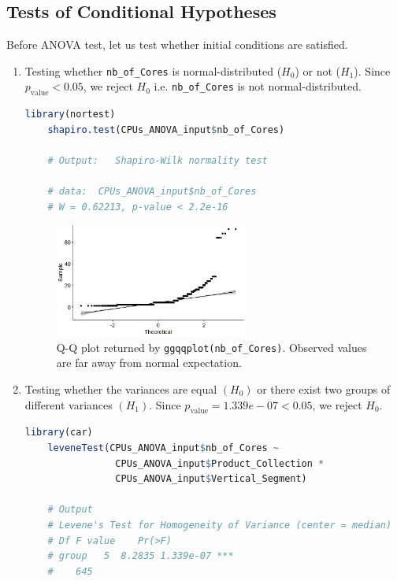 \subsection{Tests of Conditional Hypotheses}
Before ANOVA test, let us test whether initial conditions are satisfied.
\begin{enumerate}
  \item Testing whether \texttt{nb\_of\_Cores} is normal-distributed ($H_0$) or not ($H_1$). Since $p_{\mathrm{value}}< 0.05$, we reject $H_0$ i.e. \texttt{nb\_of\_Cores} is not normal-distributed.
        \begin{lstlisting}[language=R]
    library(nortest)
    shapiro.test(CPUs_ANOVA_input$nb_of_Cores)

    # Output: 	Shapiro-Wilk normality test

    # data:  CPUs_ANOVA_input$nb_of_Cores
    # W = 0.62213, p-value < 2.2e-16
  \end{lstlisting}

        \begin{figure}[ht]
          \centering
          \includegraphics[width=0.6\textwidth]{img/5.png}
          \vspace{0.5cm}
          \caption{Q-Q plot returned by \texttt{ggqqplot(nb\_of\_Cores)}. Observed values are far away from normal expectation.}
        \end{figure}

  \item Testing whether the variances are equal $(H_0)$ or there exist two groups of different variances $(H_1)$. Since $p_{\mathrm{value}} = 1.339e-07 < 0.05$, we reject $H_0$.
        \begin{lstlisting}[language=R]
    library(car)
    leveneTest(CPUs_ANOVA_input$nb_of_Cores ~ 
                CPUs_ANOVA_input$Product_Collection * 
                CPUs_ANOVA_input$Vertical_Segment)

    # Output
    # Levene's Test for Homogeneity of Variance (center = median)
    # Df F value    Pr(>F)    
    # group   5  8.2835 1.339e-07 ***
    #    645    
  \end{lstlisting}
\end{enumerate}

